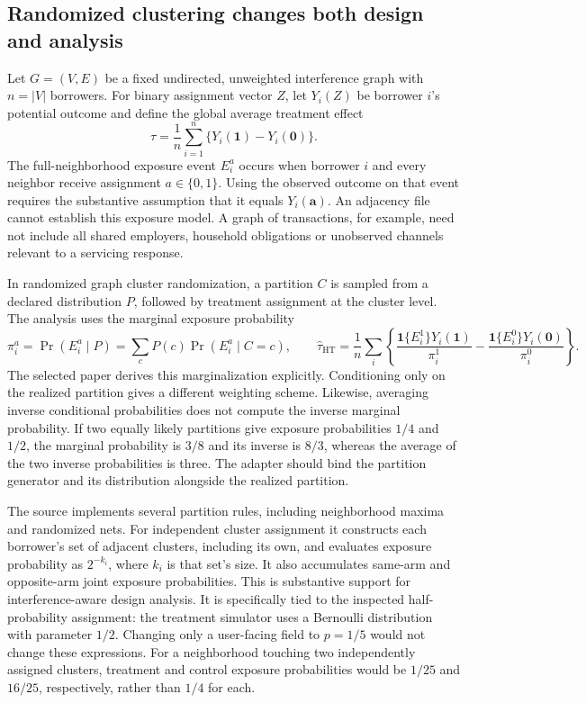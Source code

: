 \subsection{Randomized clustering changes both design and analysis}

Let $G=(V,E)$ be a fixed undirected, unweighted interference graph with $n=|V|$ borrowers. For binary assignment vector $Z$, let $Y_i(Z)$ be borrower $i$'s potential outcome and define the global average treatment effect
\[
 \tau=\frac{1}{n}\sum_{i=1}^n\{Y_i(\mathbf{1})-Y_i(\mathbf{0})\}.
\]
The full-neighborhood exposure event $E_i^a$ occurs when borrower $i$ and every neighbor receive assignment $a\in\{0,1\}$. Using the observed outcome on that event requires the substantive assumption that it equals $Y_i(\mathbf{a})$. An adjacency file cannot establish this exposure model. A graph of transactions, for example, need not include all shared employers, household obligations or unobserved channels relevant to a servicing response.\citep{exec25_cnet_paper,exec25_cnet_choice}

In randomized graph cluster randomization, a partition $C$ is sampled from a declared distribution $P$, followed by treatment assignment at the cluster level. The analysis uses the marginal exposure probability
\[
 \pi_i^a=\Pr(E_i^a\mid P)=\sum_c P(c)\Pr(E_i^a\mid C=c),
 \qquad
 \widehat\tau_{\mathrm{HT}}=
 \frac{1}{n}\sum_i\left\{
 \frac{\mathbf{1}\{E_i^1\}Y_i(\mathbf{1})}{\pi_i^1}
 -\frac{\mathbf{1}\{E_i^0\}Y_i(\mathbf{0})}{\pi_i^0}
 \right\}.
\]
The selected paper derives this marginalization explicitly. Conditioning only on the realized partition gives a different weighting scheme. Likewise, averaging inverse conditional probabilities does not compute the inverse marginal probability. If two equally likely partitions give exposure probabilities $1/4$ and $1/2$, the marginal probability is $3/8$ and its inverse is $8/3$, whereas the average of the two inverse probabilities is three. The adapter should bind the partition generator and its distribution alongside the realized partition.\citep{exec25_cnet_paper,exec25_cnet_choice}

The source implements several partition rules, including neighborhood maxima and randomized nets. For independent cluster assignment it constructs each borrower's set of adjacent clusters, including its own, and evaluates exposure probability as $2^{-k_i}$, where $k_i$ is that set's size. It also accumulates same-arm and opposite-arm joint exposure probabilities. This is substantive support for interference-aware design analysis. It is specifically tied to the inspected half-probability assignment: the treatment simulator uses a Bernoulli distribution with parameter $1/2$. Changing only a user-facing field to $p=1/5$ would not change these expressions. For a neighborhood touching two independently assigned clusters, treatment and control exposure probabilities would be $1/25$ and $16/25$, respectively, rather than $1/4$ for each.\citep{exec25_cnet_rgcr,exec25_cnet_choice}

